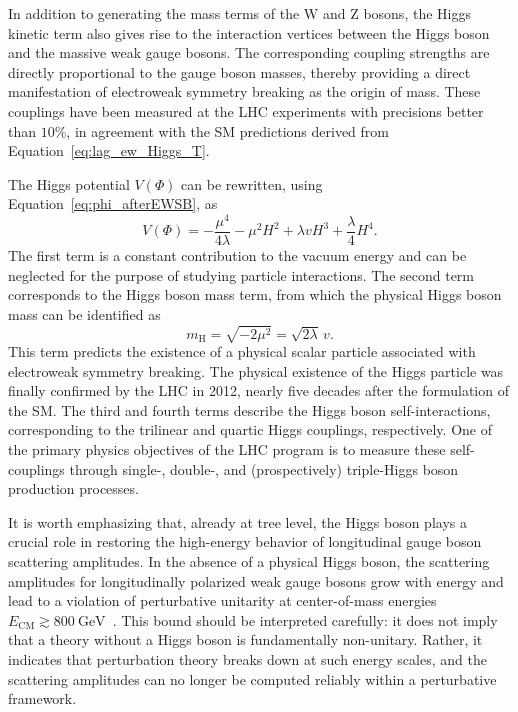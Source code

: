 In addition to generating the mass terms of the $\text{W}$ and $\text{Z}$ bosons, the Higgs kinetic term also gives rise to the interaction vertices between the Higgs boson and the massive weak gauge bosons. The corresponding coupling strengths are directly proportional to the gauge boson masses, thereby providing a direct manifestation of electroweak symmetry breaking as the origin of mass. These couplings have been measured at the LHC experiments with precisions better than $10\%$, in agreement with the SM predictions derived from Equation~\eqref{eq:lag_ew_Higgs_T}.

The Higgs potential $V(\Phi)$ can be rewritten, using Equation~\eqref{eq:phi_afterEWSB}, as
\begin{equation}\label{eq:lag_ew_Higss_V}
    V(\Phi) = -\frac{\mu^{4}}{4\lambda}
              - \mu^{2} H^{2}
              + \lambda v H^{3}
              + \frac{\lambda}{4} H^{4}.
\end{equation}
The first term is a constant contribution to the vacuum energy and can be neglected for the purpose of studying particle interactions.
The second term corresponds to the Higgs boson mass term, from which the physical Higgs boson mass can be identified as
\begin{equation}
    m_{\text{H}} = \sqrt{-2\mu^{2}} = \sqrt{2\lambda}\, v.
\end{equation}
This term predicts the existence of a physical scalar particle associated with electroweak symmetry breaking. The physical existence of the Higgs particle was finally confirmed by the LHC in 2012, nearly five decades after the formulation of the SM. 
The third and fourth terms describe the Higgs boson self-interactions, corresponding to the trilinear and quartic Higgs couplings, respectively. One of the primary physics objectives of the LHC program is to measure these self-couplings through single-, double-, and (prospectively) triple-Higgs boson production processes.

It is worth emphasizing that, already at tree level, the Higgs boson plays a crucial role in restoring the high-energy behavior of longitudinal gauge boson scattering amplitudes. In the absence of a physical Higgs boson, the scattering amplitudes for longitudinally polarized weak gauge bosons grow with energy and lead to a violation of perturbative unitarity at center-of-mass energies $E_{\text{CM}} \gtrsim 800~\text{GeV}$~\cite{Schwartz2014sze}. 
This bound should be interpreted carefully: it does not imply that a theory without a Higgs boson is fundamentally non-unitary. Rather, it indicates that perturbation theory breaks down at such energy scales, and the scattering amplitudes can no longer be computed reliably within a perturbative framework.

